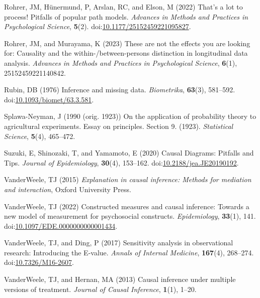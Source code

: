 \documentclass[
  singlecolumn]{article}
\newlength{\cslhangindent}
\newenvironment{CSLReferences}[2] %
 {\begin{list}{}{%
  \setlength{\itemindent}{0pt}
  \setlength{\leftmargin}{0pt}
  \setlength{\parsep}{0pt}
  \ifodd #1
   \setlength{\leftmargin}{\cslhangindent}
   \setlength{\itemindent}{-1\cslhangindent}
  \fi
  \setlength{\itemsep}{#2\baselineskip}}}
 {\end{list}}
\begin{document}
\begin{CSLReferences}{1}{0}
Rohrer, JM, Hünermund, P, Arslan, RC, and Elson, M (2022) That's a lot
to process! Pitfalls of popular path models. \emph{Advances in Methods
and Practices in Psychological Science}, \textbf{5}(2).
doi:\href{https://doi.org/10.1177/25152459221095827}{10.1177/25152459221095827}.

Rohrer, JM, and Murayama, K (2023) These are not the effects you are
looking for: Causality and the within-/between-persons distinction in
longitudinal data analysis. \emph{Advances in Methods and Practices in
Psychological Science}, \textbf{6}(1), 25152459221140842.

Rubin, DB (1976) Inference and missing data. \emph{Biometrika},
\textbf{63}(3), 581--592.
doi:\href{https://doi.org/10.1093/biomet/63.3.581}{10.1093/biomet/63.3.581}.

Splawa-Neyman, J (1990 (orig. 1923)) On the application of probability
theory to agricultural experiments. Essay on principles. Section 9.
(1923). \emph{Statistical Science}, \textbf{5}(4), 465--472.

Suzuki, E, Shinozaki, T, and Yamamoto, E (2020) Causal Diagrams:
Pitfalls and Tips. \emph{Journal of Epidemiology}, \textbf{30}(4),
153--162.
doi:\href{https://doi.org/10.2188/jea.JE20190192}{10.2188/jea.JE20190192}.

VanderWeele, TJ (2015) \emph{Explanation in causal inference: Methods
for mediation and interaction}, Oxford University Press.

VanderWeele, TJ (2022) Constructed measures and causal inference:
Towards a new model of measurement for psychosocial constructs.
\emph{Epidemiology}, \textbf{33}(1), 141.
doi:\href{https://doi.org/10.1097/EDE.0000000000001434}{10.1097/EDE.0000000000001434}.

VanderWeele, TJ, and Ding, P (2017) Sensitivity analysis in
observational research: Introducing the {E}-value. \emph{Annals of
Internal Medicine}, \textbf{167}(4), 268--274.
doi:\href{https://doi.org/10.7326/M16-2607}{10.7326/M16-2607}.

VanderWeele, TJ, and Hernan, MA (2013) Causal inference under multiple
versions of treatment. \emph{Journal of Causal Inference},
\textbf{1}(1), 1--20.


\end{CSLReferences}
\end{document}
